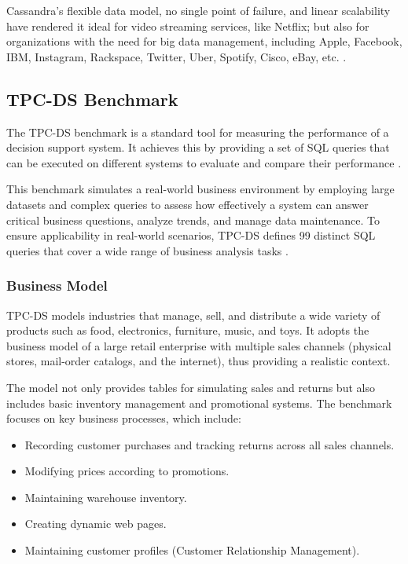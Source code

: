 \documentclass[conference]{IEEEtran}
\begin{document}
Cassandra’s flexible data model, no single point of failure, and linear scalability have rendered it ideal for video streaming services, like Netflix; but also for organizations with the need for big data management, including Apple, Facebook, IBM, Instagram, Rackspace, Twitter, Uber, Spotify, Cisco, eBay, etc. \cite{b20}.



\subsection{TPC-DS Benchmark}\label{tpcds}

The TPC-DS benchmark is a standard tool for measuring the performance of a decision support system. It achieves this by providing a set of SQL queries that can be executed on different systems to evaluate and compare their performance \cite{b5}.

This benchmark simulates a real-world business environment by employing large datasets and complex queries to assess how effectively a system can answer critical business questions, analyze trends, and manage data maintenance. To ensure applicability in real-world scenarios, TPC-DS defines 99 distinct SQL queries that cover a wide range of business analysis tasks \cite{b21}.

\subsubsection{Business Model}

TPC-DS models industries that manage, sell, and distribute a wide variety of products such as food, electronics, furniture, music, and toys. It adopts the business model of a large retail enterprise with multiple sales channels (physical stores, mail-order catalogs, and the internet), thus providing a realistic context.

The model not only provides tables for simulating sales and returns but also includes basic inventory management and promotional systems. The benchmark focuses on key business processes, which include:
\begin{itemize}
    \item Recording customer purchases and tracking returns across all sales channels.
    \item Modifying prices according to promotions.
    \item Maintaining warehouse inventory.
    \item Creating dynamic web pages.
    \item Maintaining customer profiles (Customer Relationship Management).
\end{itemize}
\end{document}
